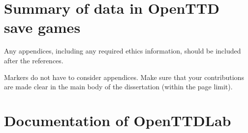 \documentclass[logo,msc,dsti]{infthesis}    %
\begin{document}
{%















\appendix

\chapter{Summary of data in OpenTTD save games}


Any appendices, including any required ethics information, should be included
after the references.

Markers do not have to consider appendices. Make sure that your contributions
are made clear in the main body of the dissertation (within the page limit).

\chapter{Documentation of OpenTTDLab}

}
\end{document}
